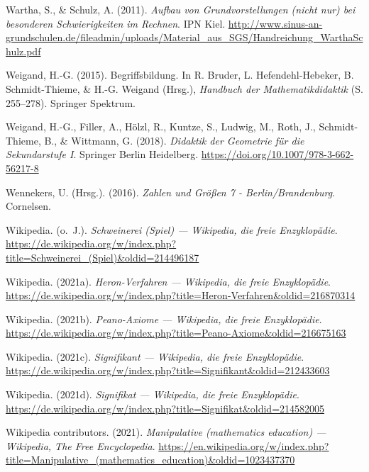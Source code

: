 \documentclass[
  ngerman,
]{scrbook}
\newlength{\cslhangindent}
\newlength{\cslentryspacingunit} %
\newenvironment{CSLReferences}[2] %
 {%
  \setlength{\parindent}{0pt}
  \ifodd #1
  \let\oldpar\par
  \def\par{\hangindent=\cslhangindent\oldpar}
  \fi
  \setlength{\parskip}{#2\cslentryspacingunit}
 }%
 {}
\theoremstyle{definition}
\theoremstyle{definition}
\theoremstyle{definition}
\theoremstyle{definition}
\theoremstyle{remark}
\begin{document}
\begin{CSLReferences}{1}{0}
\leavevmode{}%
Wartha, S., \& Schulz, A. (2011). \emph{Aufbau von {Grundvorstellungen} (nicht nur) bei besonderen {Schwierigkeiten} im {Rechnen}}. IPN Kiel. \url{http://www.sinus-an-grundschulen.de/fileadmin/uploads/Material_aus_SGS/Handreichung_WarthaSchulz.pdf}

\leavevmode{}%
Weigand, H.-G. (2015). Begriffsbildung. In R. Bruder, L. Hefendehl-Hebeker, B. Schmidt-Thieme, \& H.-G. Weigand (Hrsg.), \emph{Handbuch der {Mathematikdidaktik}} (S. 255--278). Springer Spektrum.

\leavevmode{}%
Weigand, H.-G., Filler, A., Hölzl, R., Kuntze, S., Ludwig, M., Roth, J., Schmidt-Thieme, B., \& Wittmann, G. (2018). \emph{Didaktik der {Geometrie} für die {Sekundarstufe} {I}}. Springer Berlin Heidelberg. \url{https://doi.org/10.1007/978-3-662-56217-8}

\leavevmode{}%
Wennekers, U. (Hrsg.). (2016). \emph{Zahlen und {Größen} 7 - {Berlin}/{Brandenburg}}. Cornelsen.

\leavevmode{}%
Wikipedia. (o.~J.). \emph{Schweinerei (Spiel) --- Wikipedia{,} die freie Enzyklopädie}. \url{https://de.wikipedia.org/w/index.php?title=Schweinerei_(Spiel)\&oldid=214496187}

\leavevmode{}%
Wikipedia. (2021a). \emph{Heron-Verfahren --- Wikipedia{,} die freie Enzyklopädie}. \url{https://de.wikipedia.org/w/index.php?title=Heron-Verfahren\&oldid=216870314}

\leavevmode{}%
Wikipedia. (2021b). \emph{Peano-Axiome --- Wikipedia{,} die freie Enzyklopädie}. \url{https://de.wikipedia.org/w/index.php?title=Peano-Axiome\&oldid=216675163}

\leavevmode{}%
Wikipedia. (2021c). \emph{Signifikant --- Wikipedia{,} die freie Enzyklopädie}. \url{https://de.wikipedia.org/w/index.php?title=Signifikant\&oldid=212433603}

\leavevmode{}%
Wikipedia. (2021d). \emph{Signifikat --- Wikipedia{,} die freie Enzyklopädie}. \url{https://de.wikipedia.org/w/index.php?title=Signifikat\&oldid=214582005}

\leavevmode{}%
Wikipedia contributors. (2021). \emph{Manipulative (mathematics education) --- {Wikipedia}{,} The Free Encyclopedia}. \url{https://en.wikipedia.org/w/index.php?title=Manipulative_(mathematics_education)\&oldid=1023437370}


\end{CSLReferences}
\end{document}
